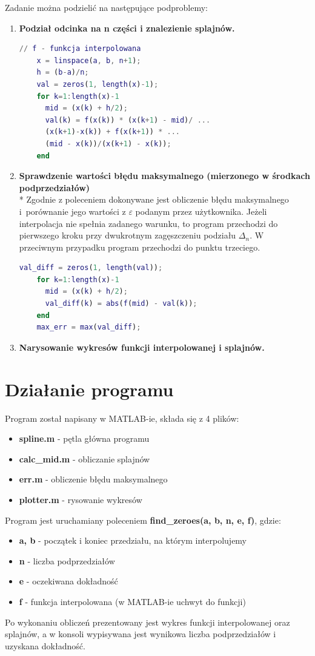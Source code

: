 \documentclass[]{article}
\begin{document}
Zadanie można podzielić na następujące podproblemy:
\begin{enumerate}
	\item \textbf{Podział odcinka na n części i znalezienie splajnów.}
	\begin{lstlisting}[mathescape, language=Matlab]
	// f - funkcja interpolowana
	x = linspace(a, b, n+1);
	h = (b-a)/n;
	val = zeros(1, length(x)-1);
	for k=1:length(x)-1
	  mid = (x(k) + h/2);
	  val(k) = f(x(k)) * (x(k+1) - mid)/ ...
	  (x(k+1)-x(k)) + f(x(k+1)) * ...
	  (mid - x(k))/(x(k+1) - x(k));     
	end
	\end{lstlisting}
	\item \textbf{Sprawdzenie wartości błędu maksymalnego (mierzonego w środkach podprzedziałów)}
	\\*
	Zgodnie z poleceniem dokonywane jest obliczenie błędu maksymalnego i~porównanie jego wartości z $\varepsilon$ podanym przez użytkownika. Jeżeli interpolacja nie spełnia zadanego warunku, to program przechodzi do pierwszego kroku przy dwukrotnym zagęszczeniu podziału $\Delta_n$. W przeciwnym przypadku program przechodzi do punktu trzeciego.
	\begin{lstlisting}[mathescape, language=Matlab]
	val_diff = zeros(1, length(val));
	for k=1:length(x)-1
	  mid = (x(k) + h/2);
	  val_diff(k) = abs(f(mid) - val(k));
	end
	max_err = max(val_diff);
	\end{lstlisting}
	\item \textbf{Narysowanie wykresów funkcji interpolowanej i splajnów.}
\end{enumerate}
\section{Działanie programu}
Program został napisany w MATLAB-ie, składa się z 4 plików:
\begin{itemize}
	\item \textbf{spline.m} - pętla główna programu
	\item \textbf{calc\_mid.m} - obliczanie splajnów
	\item \textbf{err.m} - obliczenie błędu maksymalnego
	\item \textbf{plotter.m} - rysowanie wykresów
\end{itemize}
Program jest uruchamiany poleceniem \textbf{find\_zeroes(a, b, n, e, f)}, gdzie:
\begin{itemize}
	\item \textbf{a, b} - początek i koniec przedziału, na którym interpolujemy
	\item \textbf{n} - liczba podprzedziałów
	\item \textbf{e} - oczekiwana dokładność
	\item \textbf{f} - funkcja interpolowana (w MATLAB-ie uchwyt do funkcji)
\end{itemize}
Po wykonaniu obliczeń prezentowany jest wykres funkcji interpolowanej oraz splajnów, a w konsoli wypisywana jest wynikowa liczba podprzedziałów i uzyskana dokładność.
\end{document}
